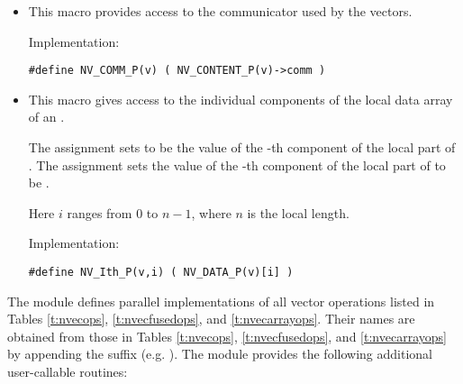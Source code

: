 \begin{itemize}
\item {}

  This macro provides access to the {\mpi} communicator used by the {\nvecp}
  vectors.

  Implementation:

  \verb|#define NV_COMM_P(v) ( NV_CONTENT_P(v)->comm )|

\item {}

  This macro gives access to the individual components of the local data
  array of an .

  The assignment  sets  to be the value of 
  the -th component of the local part of . 
  The assignment    
  sets the value of the -th component of the local part of  
  to be .        
  
  Here $i$ ranges from $0$ to $n-1$, where $n$ is the local length.
      
  Implementation:

  \verb|#define NV_Ith_P(v,i) ( NV_DATA_P(v)[i] )|

\end{itemize}
The {\nvecp} module defines parallel implementations of all vector operations listed 
in Tables \ref{t:nvecops}, \ref{t:nvecfusedops}, and \ref{t:nvecarrayops}. Their names
are obtained from those in Tables \ref{t:nvecops}, \ref{t:nvecfusedops}, and
\ref{t:nvecarrayops} by appending the suffix 
(e.g. ).
The module {\nvecp} provides the following additional
user-callable routines:

